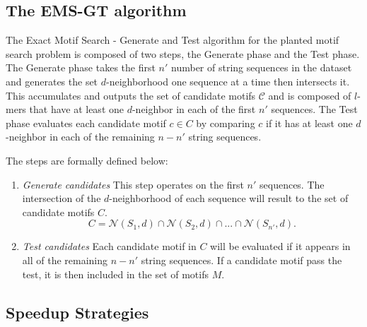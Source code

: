 
\subsection{The EMS-GT algorithm}

The Exact Motif Search - Generate and Test algorithm for the planted motif search problem is composed of two steps, the Generate phase and the Test phase. The Generate phase takes the first $n'$ number of string sequences in the dataset and generates the set $d$-neighborhood one sequence at a time then intersects it. 
This accumulates and outputs the set of candidate motifs $\mathcal{C}$ and is composed of $l$-mers that have at least one $d$-neighbor in each of the first $n'$ sequences. The Test phase evaluates each candidate motif $c \in C$ by comparing $c$ if it has at least one $d$-neighbor in each of the remaining $n - n'$ string sequences. \newline

\noindent The steps are formally defined below:
\begin{enumerate}[label={\em (\alph*)}]
	\item {\em Generate candidates}\newline
	This step operates on the first $n'$ sequences. The intersection of the $d$-neighborhood of each sequence will result to the set of candidate motifs $C$.\newline
	\begin{equation}
		C = \mathcal{N}(S_{1}, d) \cap \mathcal{N}(S_{2}, d) \cap...\cap \mathcal{N}(S_{n'}, d).
	\end{equation} 

	\item {\em Test candidates}\newline
	Each candidate motif in $C$ will be evaluated if it appears in all of the remaining $n - n'$ string sequences. If a candidate motif pass the test, it is then included in the set of motifs $M$. 
\end{enumerate}

% 

% 

\bigskip

\subsection{Speedup Strategies}

